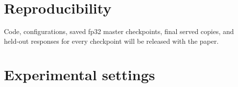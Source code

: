 \documentclass[
  10pt,
]{article}
\begin{document}
\section*{Reproducibility}\label{reproducibility}

Code, configurations, saved fp32 master checkpoints, final served copies, and held-out responses for
every checkpoint will be released with the paper.

\appendix
\setcounter{table}{0}

\section{Experimental settings}\label{experimental-settings}
\end{document}
